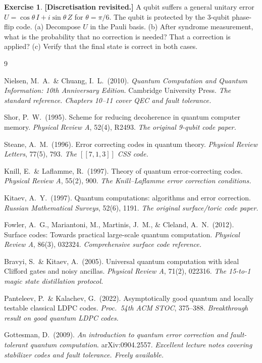 \documentclass[11pt, a4paper]{article}
\theoremstyle{definition}
\newtheorem{exercise}{Exercise}[section]
\theoremstyle{plain}
\theoremstyle{remark}
\newcommand{\code}[1]{[\![#1]\!]}
\begin{document}
\begin{exercise}
\textbf{[Discretisation revisited.]}
A qubit suffers a general unitary error $U = \cos\theta\, I + i\sin\theta\, Z$
for $\theta = \pi/6$.  The qubit is protected by the 3-qubit phase-flip code.
(a) Decompose $U$ in the Pauli basis.
(b) After syndrome measurement, what is the probability that no correction
    is needed?  That a correction is applied?
(c) Verify that the final state is correct in both cases.
\end{exercise}

\newpage
\begin{thebibliography}{9}

Nielsen, M.~A.\ \& Chuang, I.~L.\ (2010).
\textit{Quantum Computation and Quantum Information: 10th Anniversary Edition}.
Cambridge University Press.
\textit{The standard reference.  Chapters 10--11 cover QEC and fault tolerance.}

Shor, P.~W.\ (1995).
Scheme for reducing decoherence in quantum computer memory.
\textit{Physical Review A}, 52(4), R2493.
\textit{The original 9-qubit code paper.}

Steane, A.~M.\ (1996).
Error correcting codes in quantum theory.
\textit{Physical Review Letters}, 77(5), 793.
\textit{The $\code{7,1,3}$ CSS code.}

Knill, E.\ \& Laflamme, R.\ (1997).
Theory of quantum error-correcting codes.
\textit{Physical Review A}, 55(2), 900.
\textit{The Knill--Laflamme error correction conditions.}

Kitaev, A.~Y.\ (1997).
Quantum computations: algorithms and error correction.
\textit{Russian Mathematical Surveys}, 52(6), 1191.
\textit{The original surface/toric code paper.}

Fowler, A.~G., Mariantoni, M., Martinis, J.~M., \& Cleland, A.~N.\ (2012).
Surface codes: Towards practical large-scale quantum computation.
\textit{Physical Review A}, 86(3), 032324.
\textit{Comprehensive surface code reference.}

Bravyi, S.\ \& Kitaev, A.\ (2005).
Universal quantum computation with ideal Clifford gates and noisy ancillas.
\textit{Physical Review A}, 71(2), 022316.
\textit{The 15-to-1 magic state distillation protocol.}

Panteleev, P.\ \& Kalachev, G.\ (2022).
Asymptotically good quantum and locally testable classical LDPC codes.
\textit{Proc.\ 54th ACM STOC}, 375--388.
\textit{Breakthrough result on good quantum LDPC codes.}

Gottesman, D.\ (2009).
\textit{An introduction to quantum error correction and fault-tolerant quantum
computation}.
arXiv:0904.2557.
\textit{Excellent lecture notes covering stabilizer codes and fault tolerance.
Freely available.}

\end{thebibliography}
\end{document}
